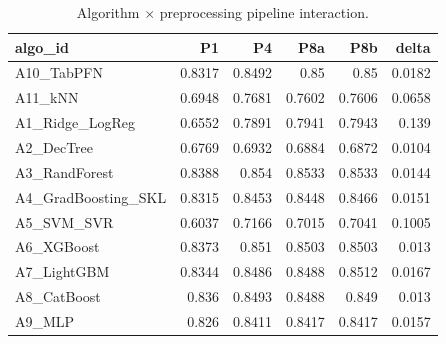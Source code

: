\begin{table}
\caption{Algorithm $\times$ preprocessing pipeline interaction.}
\label{tab:algo_interaction}
\begin{tabular}{lrrrrr}
\toprule
algo\_id & P1 & P4 & P8a & P8b & delta \\
\midrule
A10\_TabPFN & 0.8317 & 0.8492 & 0.85 & 0.85 & 0.0182 \\
A11\_kNN & 0.6948 & 0.7681 & 0.7602 & 0.7606 & 0.0658 \\
A1\_Ridge\_LogReg & 0.6552 & 0.7891 & 0.7941 & 0.7943 & 0.139 \\
A2\_DecTree & 0.6769 & 0.6932 & 0.6884 & 0.6872 & 0.0104 \\
A3\_RandForest & 0.8388 & 0.854 & 0.8533 & 0.8533 & 0.0144 \\
A4\_GradBoosting\_SKL & 0.8315 & 0.8453 & 0.8448 & 0.8466 & 0.0151 \\
A5\_SVM\_SVR & 0.6037 & 0.7166 & 0.7015 & 0.7041 & 0.1005 \\
A6\_XGBoost & 0.8373 & 0.851 & 0.8503 & 0.8503 & 0.013 \\
A7\_LightGBM & 0.8344 & 0.8486 & 0.8488 & 0.8512 & 0.0167 \\
A8\_CatBoost & 0.836 & 0.8493 & 0.8488 & 0.849 & 0.013 \\
A9\_MLP & 0.826 & 0.8411 & 0.8417 & 0.8417 & 0.0157 \\
\bottomrule
\end{tabular}
\end{table}
